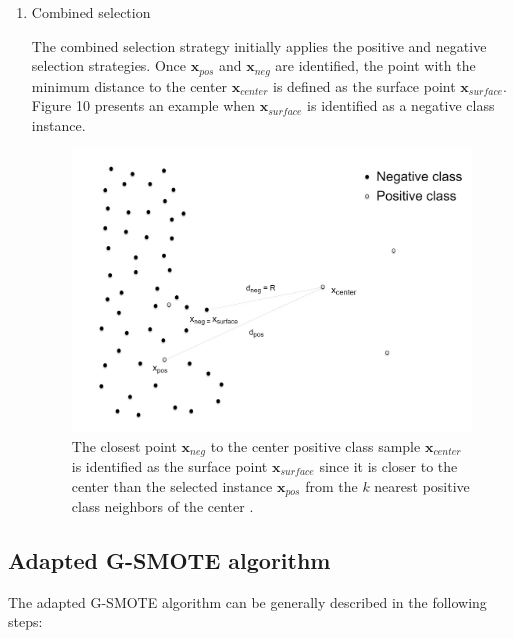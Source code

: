 \documentclass[parskip=full]{scrartcl}
\begin{document}
\begin{enumerate}[label=($\alph*$)]
\item Combined selection

The combined selection strategy initially applies the positive and negative 
selection strategies. Once \( \textbf{x}_{pos} \) and \( \textbf{x}_{neg} \) 
are identified, the point with the minimum distance to the center \( 
\textbf{x}_{center} \) is defined as the surface point \( \textbf{x}_{surface} 
\). Figure 10 presents an example when \( \textbf{x}_{surface} \) is identified 
as a negative class instance.

\begin{figure}[H]
	\centering
	\includegraphics[width=0.52\linewidth]
		{../analysis/combined_class_selection_strategy}
	\caption{The closest point \( \textbf{x}_{neg} \) to the center positive 
	class sample \( \textbf{x}_{center} \) is identified as the surface point 
	\( \textbf{x}_{surface} \) since it is closer to the center than the 
	selected instance \( \textbf{x}_{pos} \) from the \( k \) nearest 
	positive class neighbors of the center \cite{Douzas.2019b}.}
	\label{fig:combinedclassselectionstrategy}
\end{figure}

\end{enumerate}

\subsection{Adapted G-SMOTE algorithm}

The adapted G-SMOTE algorithm can be generally described in the following steps:
\end{document}
